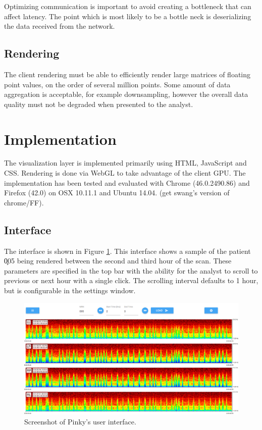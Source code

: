 Optimizing communication is important to avoid creating a bottleneck that can
affect latency. The point which is most likely to be a bottle neck is
deserializing the data received from the network.

\subsection{Rendering}

The client rendering must be able to efficiently render large matrices of
floating point values, on the order of several million points. Some amount of
data aggregation is acceptable, for example downsampling, however the overall
data quality must not be degraded when presented to the analyst.

\section{Implementation}

The visualization layer is implemented primarily using HTML, JavaScript and
CSS. Rendering is done via WebGL to take advantage of the client GPU. The
implementation has been tested and evaluated with Chrome (46.0.2490.86) and
Firefox (42.0) on OSX 10.11.1 and Ubuntu 14.04. (get swang's version of
chrome/FF).

\subsection{Interface}

The interface is shown in Figure \ref{fig:whole-interface}. This interface
shows a sample of the patient \c{005} being rendered between the second and
third hour of the scan. These parameters are specified in the top bar with the
ability for the analyst to scroll to previous or next hour with a single click.
The scrolling interval defaults to 1 hour, but is configurable in the settings
window. \\

\begin{figure}[h]
\begin{center}
\includegraphics[scale=0.35]{./img/whole-interface.png}
\caption{Screenshot of Pinky's user interface.}
\label{fig:whole-interface}
\end{center}
\end{figure}

